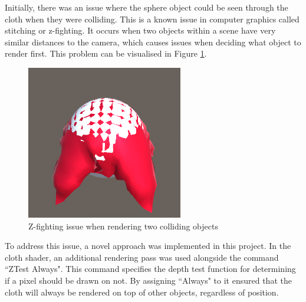 \documentclass[12pt,a4paper]{article}
\begin{document}
Initially, there was an issue where the sphere object could be seen through the cloth when they were colliding. This is a known issue in computer graphics called stitching or z-fighting. It occurs when two objects within a scene have very similar distances to the camera, which causes issues when deciding what object to render first. This problem can be visualised in Figure \ref{fig:zfight}. \\
\begin{figure}
	\centering
	\includegraphics[scale=0.5]{zfight.png}
	\caption{Z-fighting issue when rendering two colliding objects}
	\label{fig:zfight}
\end{figure}

To address this issue, a novel approach was implemented in this project. In the cloth shader, an additional rendering pass was used alongside the command ``ZTest Always". This command specifies the depth test function for determining if a pixel should be drawn on not. By assigning ``Always" to it ensured that the cloth will always be rendered on top of other objects, regardless of position. \\
\end{document}
